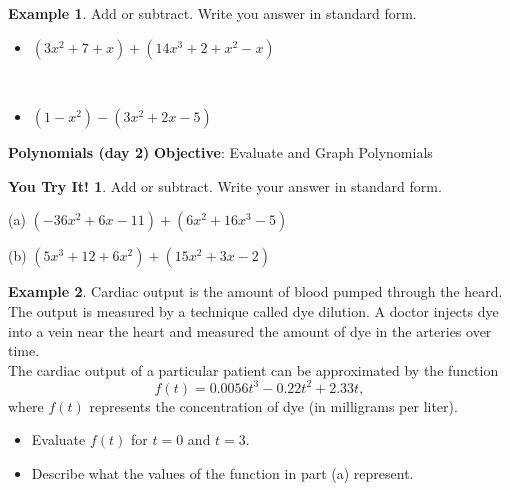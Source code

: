 \documentclass{report}
\theoremstyle{definition}
\newtheorem{example}{\bf Example}
\newtheorem{youtry}{\bf You Try It!}
\begin{document}
\vspace{-0.75cm}
\begin{example}
Add or subtract. Write you answer in standard form.
\end{example}

\begin{minipage}[t]{0.45\linewidth}
	\begin{itemize}
		\item[(a.)] $(3x^2+7+x)+(14x^3+2+x^2-x)$
	\end{itemize}
\end{minipage}\
\begin{minipage}[t]{0.45\linewidth}
	\begin{itemize}
		\item[(b.)] $(1-x^2)-(3x^2+2x-5)$
	\end{itemize}
\end{minipage}

\vfill

 \noindent{} \hfill 
 \newpage

\noindent\Large{\textbf{Polynomials (day 2)}}  \indent\hfill\small\noindent \textbf{Objective}: Evaluate and Graph Polynomials \normalsize\\

\begin{youtry}
Add or subtract. Write your answer in standard form.
\end{youtry}

\begin{minipage}[t]{0.45\linewidth}
(a) $(-36x^2+6x-11)+(6x^2+16x^3-5)$
\end{minipage}
\hfill
\begin{minipage}[t]{0.45\linewidth}
(b) $(5x^3+12+6x^2)+(15x^2+3x-2)$
\end{minipage}
\vfill
\begin{example}
Cardiac output is the amount of blood pumped through the heard. The output is measured by a technique called dye dilution. A doctor injects dye into a vein near the heart and measured the amount of dye in the arteries over time.\\

\noindent The cardiac output of a particular patient can be approximated by the function
\[f(t) = 0.0056t^3-0.22t^2+2.33t,\]
where $f(t)$ represents the concentration  of dye (in milligrams per liter).
\end{example}
\begin{itemize}
	\item[(a)] Evaluate $f(t)$ for $t=0$ and $t=3$.
	\vfill
	\item[(b)] Describe what the values of the function in part (a) represent.
	\vfill
\end{itemize}
\end{document}
